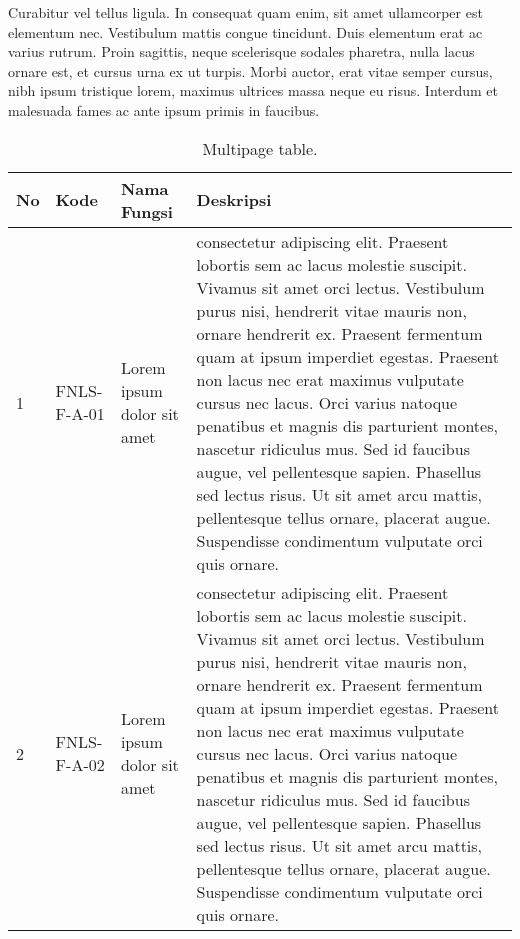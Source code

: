 Curabitur vel tellus ligula. In consequat quam enim, sit amet
ullamcorper est elementum nec. Vestibulum mattis congue
tincidunt. Duis elementum erat ac varius rutrum. Proin sagittis, neque
scelerisque sodales pharetra, nulla lacus ornare est, et cursus urna
ex ut turpis. Morbi auctor, erat vitae semper cursus, nibh ipsum
tristique lorem, maximus ultrices massa neque eu risus. Interdum et
malesuada fames ac ante ipsum primis in faucibus.

\begin{longtable}[c]{|l|l|p{3cm}|p{7cm}|} %
  \caption{Multipage table.}
  \label{tab:table1}\\
  \toprule
  \hline \textbf{No} & \textbf{Kode} & \textbf{Nama Fungsi} & \textbf{Deskripsi}\\ \hline
  \midrule
  \endfirsthead %
  \toprule
  \midrule
  \endhead %
1 & FNLS-F-A-01 & Lorem ipsum dolor sit amet& consectetur adipiscing elit. Praesent lobortis sem ac lacus molestie suscipit. Vivamus sit amet orci lectus. Vestibulum purus nisi, hendrerit vitae mauris non, ornare hendrerit ex. Praesent fermentum quam at ipsum imperdiet egestas. Praesent non lacus nec erat maximus vulputate cursus nec lacus. Orci varius natoque penatibus et magnis dis parturient montes, nascetur ridiculus mus. Sed id faucibus augue, vel pellentesque sapien. Phasellus sed lectus risus. Ut sit amet arcu mattis, pellentesque tellus ornare, placerat augue. Suspendisse condimentum vulputate orci quis ornare.\\ \hline
2 & FNLS-F-A-02 & Lorem ipsum dolor sit amet& consectetur adipiscing elit. Praesent lobortis sem ac lacus molestie suscipit. Vivamus sit amet orci lectus. Vestibulum purus nisi, hendrerit vitae mauris non, ornare hendrerit ex. Praesent fermentum quam at ipsum imperdiet egestas. Praesent non lacus nec erat maximus vulputate cursus nec lacus. Orci varius natoque penatibus et magnis dis parturient montes, nascetur ridiculus mus. Sed id faucibus augue, vel pellentesque sapien. Phasellus sed lectus risus. Ut sit amet arcu mattis, pellentesque tellus ornare, placerat augue. Suspendisse condimentum vulputate orci quis ornare.\\ \hline

\end{longtable}
